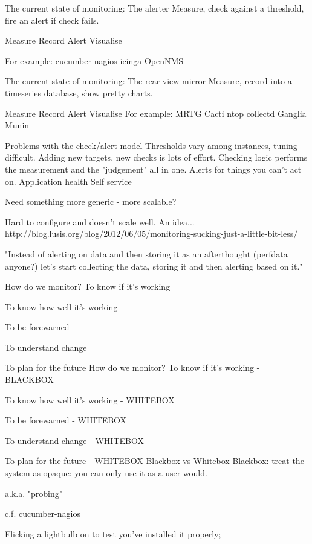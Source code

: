 \documentclass[online,12pt,helvetica]{chaksem}
\begin{document}
The current state of monitoring:
The alerter
Measure, check against a threshold, fire an alert if check fails.

Measure
Record
Alert
Visualise


For example:
cucumber
nagios
icinga
OpenNMS

The current state of monitoring:
The rear view mirror
Measure, record into a timeseries database, show pretty charts.

Measure
Record
Alert
Visualise
For example:
MRTG
Cacti
ntop 
collectd
Ganglia
Munin

Problems with the check/alert model
Thresholds vary among instances, tuning difficult.
Adding new targets, new checks is lots of effort.
Checking logic performs the measurement and the "judgement" all in one.
Alerts for things you can't act on.
Application health
Self service

Need something more generic - more scalable?



Hard to configure and doesn't scale well.
An idea...
http://blog.lusis.org/blog/2012/06/05/monitoring-sucking-just-a-little-bit-less/

"Instead of alerting on data and then storing it as an afterthought (perfdata anyone?) let’s start collecting the
data, storing it and then alerting based on it."


How do we monitor?
To know if it's working

To know how well it's working

To be forewarned

To understand change

To plan for the future
How do we monitor?
To know if it's working - BLACKBOX

To know how well it's working - WHITEBOX

To be forewarned - WHITEBOX

To understand change - WHITEBOX

To plan for the future - WHITEBOX
Blackbox vs Whitebox
Blackbox: treat the system as opaque: you can only use it as a user would.

a.k.a. "probing"

c.f. cucumber-nagios

Flicking a lightbulb on to test you've installed it properly;                                                                                                  
                                                                                                                                                               
\end{document}
